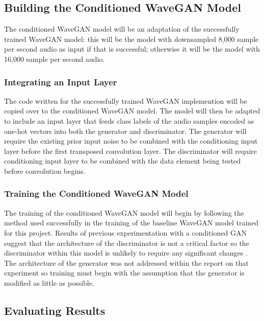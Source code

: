 \documentclass[a4paper, dvipsnames, titlepage]{article}
\begin{document}
\subsection{Building the Conditioned WaveGAN Model}

The conditioned WaveGAN model will be an adaptation of the successfully trained WaveGAN model: this will be the model with downsampled 8,000 sample per second audio as input if that is successful; otherwise it will be the model with 16,000 sample per second audio.

\subsubsection{Integrating an Input Layer}

The code written for the successfully trained WaveGAN implemention will be copied over to the conditioned WaveGAN model.
The model will then be adapted to include an input layer that feeds class labels of the audio samples encoded as one-hot vectors into both the generator and discriminator.
The generator will require the existing prior input noise to be combined with the conditioning input layer before the first transposed convolution layer.
The discriminator will require conditioning input layer to be combined with the data element being tested before convolution begins.

\subsubsection{Training the Conditioned WaveGAN Model}

The training of the conditioned WaveGAN model will begin by following the method used successfully in the training of the baseline WaveGAN model trained for this project.
Results of previous experimentation with a conditioned GAN suggest that the architecture of the discriminator is not a critical factor so the discriminator within this model is unlikely to require any significant changes \cite{2014arXiv1411.1784M}.
The architecture of the generator was not addressed within the report on that experiment so training must begin with the assumption that the generator is modified as little as possible.

\subsection{Evaluating Results}
\end{document}
